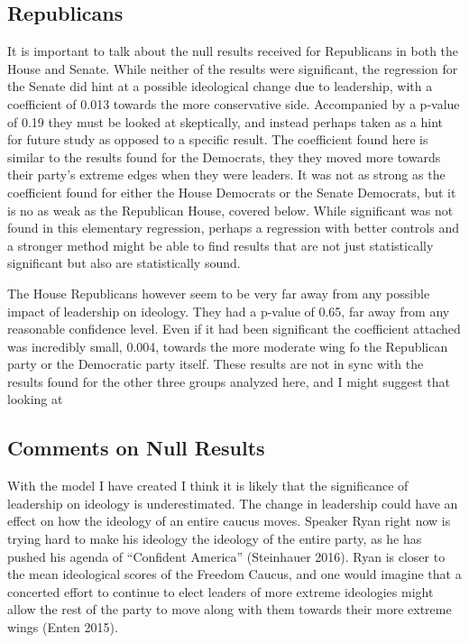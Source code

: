 \documentclass[12pt,twoside]{reedthesis}
\begin{document}
  \subsection{Republicans}\label{republicans}
  
  It is important to talk about the null results received for Republicans
  in both the House and Senate. While neither of the results were
  significant, the regression for the Senate did hint at a possible
  ideological change due to leadership, with a coefficient of 0.013
  towards the more conservative side. Accompanied by a p-value of 0.19
  they must be looked at skeptically, and instead perhaps taken as a hint
  for future study as opposed to a specific result. The coefficient found
  here is similar to the results found for the Democrats, they they moved
  more towards their party's extreme edges when they were leaders. It was
  not as strong as the coefficient found for either the House Democrats or
  the Senate Democrats, but it is no as weak as the Republican House,
  covered below. While significant was not found in this elementary
  regression, perhaps a regression with better controls and a stronger
  method might be able to find results that are not just statistically
  significant but also are statistically sound.
  
  The House Republicans however seem to be very far away from any possible
  impact of leadership on ideology. They had a p-value of 0.65, far away
  from any reasonable confidence level. Even if it had been significant
  the coefficient attached was incredibly small, 0.004, towards the more
  moderate wing fo the Republican party or the Democratic party itself.
  These results are not in sync with the results found for the other three
  groups analyzed here, and I might suggest that looking at
  
  \subsection{Comments on Null Results}\label{comments-on-null-results}
  
  With the model I have created I think it is likely that the significance
  of leadership on ideology is underestimated. The change in leadership
  could have an effect on how the ideology of an entire caucus moves.
  Speaker Ryan right now is trying hard to make his ideology the ideology
  of the entire party, as he has pushed his agenda of ``Confident
  America'' (Steinhauer 2016). Ryan is closer to the mean ideological
  scores of the Freedom Caucus, and one would imagine that a concerted
  effort to continue to elect leaders of more extreme ideologies might
  allow the rest of the party to move along with them towards their more
  extreme wings (Enten 2015).
  
\end{document}
